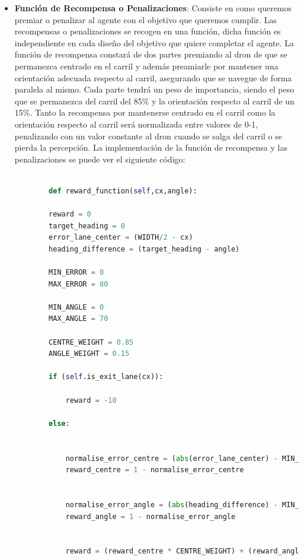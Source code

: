 \begin{itemize}
    \item \textbf{Función de Recompensa o Penalizaciones}: Consiste en como queremos premiar o penalizar al agente con el objetivo que queremos cumplir. Las recompensas o penalizaciones se recogen
    en una función, dicha función es independiente en cada diseño del objetivo que quiere completar el agente. La función de recompensa constará de dos partes premiando al dron de que se 
    permanezca centrado en el carril y además preamiarle por mantener una orientación adecuada respecto al carril, asegurando que se navegue de forma paralela al mismo. Cada parte tendrá un peso
    de importancia, siendo el peso que se permanezca del carril del 85\% y la orientación respecto al carril de un 15\%. Tanto la recompensa por mantenerse centrado en el carril 
    como la orientación respecto al carril será normalizada entre valores de 0-1, penalizando con un valor constante al dron cuando se salga del carril o 
    se pierda la percepción. La implementación de la función de recompensa y las penalizaciones se puede ver el siguiente código:

    \begin{code}[H]
      \begin{lstlisting}[language=Python]
  
        def reward_function(self,cx,angle):

        reward = 0
        target_heading = 0
        error_lane_center = (WIDTH/2 - cx)
        heading_difference = (target_heading - angle) 
        
        MIN_ERROR = 0
        MAX_ERROR = 80

        MIN_ANGLE = 0
        MAX_ANGLE = 70

        CENTRE_WEIGHT = 0.85
        ANGLE_WEIGHT = 0.15
        
        if (self.is_exit_lane(cx)):
            
            reward = -10

        else:

            
            normalise_error_centre = (abs(error_lane_center) - MIN_ERROR) / (MAX_ERROR - MIN_ERROR)
            reward_centre = 1 - normalise_error_centre

            
            normalise_error_angle = (abs(heading_difference) - MIN_ANGLE) / (MAX_ANGLE - MIN_ANGLE)
            reward_angle = 1 - normalise_error_angle


            reward = (reward_centre * CENTRE_WEIGHT) + (reward_angle * ANGLE_WEIGHT)
            

\end{lstlisting}
\end{code}
\end{itemize}
